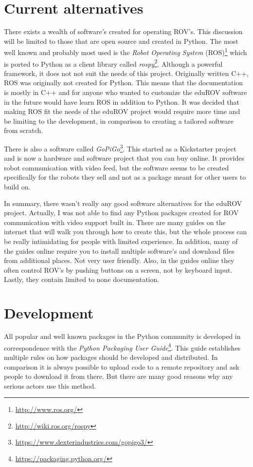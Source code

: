 \section{Current alternatives}

There exists a wealth of software's created for operating ROV's. This discussion will be limited to those that are open source and created in Python. The most well known and probably most used is the \emph{Robot Operating System} (ROS)\footnote{\url{http://www.ros.org/}} which is ported to Python as a client library called \emph{rospy}\footnote{\url{http://wiki.ros.org/rospy}}. Although a powerful framework, it does not not suit the needs of this project. Originally written C++, ROS was originally not created for Python. This means that the documentation is mostly in C++ and for anyone who wanted to customize the eduROV software in the future would have learn ROS in addition to Python. It was decided that making ROS fit the needs of the eduROV project would require more time and be limiting to the development, in comparison to creating a tailored software from scratch.

There is also a software called \emph{GoPiGo}\footnote{\url{https://www.dexterindustries.com/gopigo3/}}. This started as a Kickstarter project and is now a hardware and software project that you can buy online. It provides robot communication with video feed, but the software seems to be created specifically for the robots they sell and not as a package meant for other users to build on.

In summary, there wasn't really any good software alternatives for the eduROV project. Actually, I was not able to find any Python packages created for ROV communication with video support built in. There are many guides on the internet that will walk you through how to create this, but the whole process can be really intimidating for people with limited experience. In addition, many of the guides online require you to install multiple software's and download files from additional places. Not very user friendly. Also, in the guides online they often control ROV's by pushing buttons on a screen, not by keyboard input. Lastly, they contain limited to none documentation.

\section{Development}

All popular and well known packages in the Python community is developed in correspondence with the \emph{Python Packaging User Guide}\footnote{\url{https://packaging.python.org/}}. This guide establishes multiple rules on how packages should be developed and distributed. In comparison it is always possible to upload code to a remote repository and ask people to download it from there. But there are many good reasons why any serious actors use this method. 

